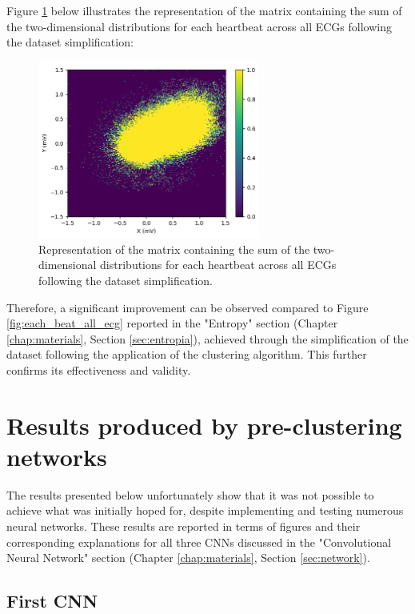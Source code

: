 \documentclass[12pt,english]{report}
\begin{document}
Figure \ref{fig:sum_each_beat_all_ecg} below illustrates the representation of the matrix containing the sum of the two-dimensional distributions for each heartbeat across all ECGs following the dataset simplification:

\begin{figure}[H]
    \centering
    \includegraphics[width=0.65\textwidth]{images/sum_each_beat_all_ecg.png}
    \captionsetup{justification=centering}
    \caption{Representation of the matrix containing the sum of the two-dimensional distributions for each heartbeat across all ECGs following the dataset simplification.}
    \label{fig:sum_each_beat_all_ecg}
\end{figure}

Therefore, a significant improvement can be observed compared to Figure \ref{fig:each_beat_all_ecg} reported in the "Entropy" section (Chapter \ref{chap:materials}, Section \ref{sec:entropia}), achieved through the simplification of the dataset following the application of the clustering algorithm. This further confirms its effectiveness and validity.

\section{Results produced by pre-clustering networks}
\label{sec:network_risultati}

The results presented below unfortunately show that it was not possible to achieve what was initially hoped for, despite implementing and testing numerous neural networks. These results are reported in terms of figures and their corresponding explanations for all three CNNs discussed in the "Convolutional Neural Network" section (Chapter \ref{chap:materials}, Section \ref{sec:network}).

\subsection{First CNN}
\label{subsec:first_cnn_results}
\end{document}
